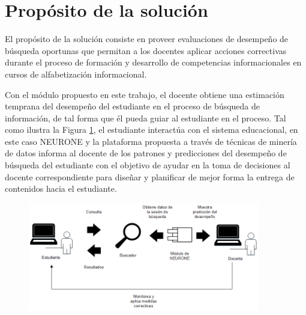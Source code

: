 \section{Propósito de la solución}
\label{sec:proposito-solucion}
El propósito de la solución consiste en proveer evaluaciones de desempeño de búsqueda oportunas que permitan a los docentes aplicar acciones correctivas durante el proceso de formación y desarrollo de competencias informacionales en cursos de alfabetización informacional.

Con el módulo propuesto en este trabajo, el docente obtiene una estimación temprana del desempeño del estudiante en el proceso de búsqueda de información, de tal forma que él pueda guiar al estudiante en el proceso. Tal como ilustra la Figura \ref{fig:docente_estudiante}, el estudiante interactúa con el sistema educacional, en este caso NEURONE y la plataforma propuesta a través de técnicas de minería de datos informa al docente de los patrones y predicciones del desempeño de búsqueda del estudiante con el objetivo de ayudar en la toma de decisiones al docente correspondiente para diseñar y planificar de mejor forma la entrega de contenidos hacia el estudiante.

\begin{figure}[H]
	\centering
	\includegraphics[width=0.9\textwidth]{03_GraphicFiles/monitor.png}
	\label{fig:docente_estudiante}
\end{figure}
